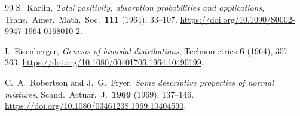 \begin{thebibliography}{99}
S.~Karlin, \emph{Total positivity, absorption probabilities and applications},
Trans.\ Amer.\ Math.\ Soc.\ \textbf{111} (1964), 33--107.
\url{https://doi.org/10.1090/S0002-9947-1964-0168010-2}.

I.~Eisenberger, \emph{Genesis of bimodal distributions},
Technometrics \textbf{6} (1964), 357--363.
\url{https://doi.org/10.1080/00401706.1964.10490199}.

C.~A.~Robertson and J.~G.~Fryer, \emph{Some descriptive properties of
normal mixtures}, Scand.\ Actuar.\ J.\ \textbf{1969} (1969), 137--146.
\url{https://doi.org/10.1080/03461238.1969.10404590}.
\end{thebibliography}

